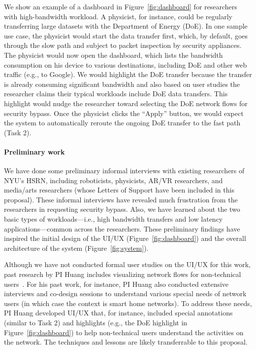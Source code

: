 We show an example of a dashboard in Figure~\ref{fig:dashboard} for researchers with high-bandwidth workload. A physicist, for instance, could be regularly transferring large datasets with the Department of Energy (DoE). In one sample use case, the physicist would start the data transfer first, which, by default, goes through the slow path and subject to packet inspection by security appliances. The physicist would now open the dashboard, which lists the bandwidth consumption on his device to various destinations, including DoE and other web traffic (e.g., to Google). We would highlight the DoE transfer because the transfer is already consuming significant bandwidth and also based on user studies the researcher claims their typical workloads include DoE data transfers. This highlight would nudge the researcher toward selecting the DoE network flows for security bypass. Once the physicist clicks the ``Apply'' button, we would expect the system to automatically reroute the ongoing DoE transfer to the fast path (Task 2).


\paragraph{Preliminary work}
We have done some preliminary informal interviews with existing researchers of NYU's HSRN, including roboticists, physicists, AR/VR researchers, and media/arts researchers (whose Letters of Support have been included in this proposal). These informal interviews have revealed much frustration from the researchers in requesting security bypass. Also, we have learned about the two basic types of workloads---i.e., high bandwidth transfers and low latency applications---common across the researchers. These preliminary findings have inspired the initial design of the UI/UX (Figure~\ref{fig:dashboard}) and the overall architecture of the system (Figure~\ref{fig:system}).

Although we have not conducted formal user studies on the UI/UX for this work, past research by PI Huang includes visualizing network flows for non-technical users~\cite{huang2020iot,thakkar2022would}. For his past work, for instance, PI Huang also conducted extensive interviews and co-design sessions to understand various special needs of network users (in which case the context is smart home networks). To address these needs, PI Huang developed UI/UX that, for instance, included special annotations (similar to Task 2) and highlights (e.g., the DoE highlight in Figure~\ref{fig:dashboard}) to help non-technical users understand the activities on the network. The techniques and lessons are likely transferrable to this proposal.

